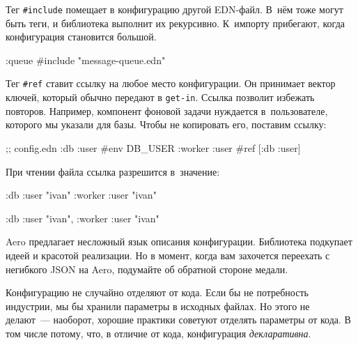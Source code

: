 \fi

Тег \verb|#include| помещает в конфигурацию другой EDN-файл. В~нём тоже могут
быть теги, и библиотека выполнит их рекурсивно. К~импорту прибегают, когда
конфигурация становится большой.

\begin{english}
  \begin{clojure}
{:queue #include "message-queue.edn"}
  \end{clojure}
\end{english}

Тег \verb|#ref| ставит ссылку на любое место конфигурации. Он принимает вектор
ключей, который обычно передают в \verb|get-in|. Ссылка позволит избежать
повторов.  Например, компонент фоновой задачи нуждается в~пользователе, которого
мы указали для базы. Чтобы не копировать его, поставим ссылку:

\begin{english}
  \begin{clojure}
;; config.edn
{:db {:user #env DB_USER}
 :worker {:user #ref [:db :user]}}
  \end{clojure}
\end{english}

\noindent
При чтении файла ссылка разрешится в~значение:

\ifx\DEVICETYPE\MOBILE

\begin{english}
  \begin{clojure}
{:db {:user "ivan"}
 :worker {:user "ivan"}}
  \end{clojure}
\end{english}

\else

\begin{english}
  \begin{clojure}
{:db {:user "ivan"}, :worker {:user "ivan"}}
  \end{clojure}
\end{english}

\fi

Aero предлагает несложный язык описания конфигурации. Библиотека подкупает идеей
и красотой реализации. Но в момент, когда вам захочется переехать с негибкого
JSON на Aero, подумайте об обратной стороне медали.


Конфигурацию не случайно отделяют от кода. Если бы не потребность индустрии, мы
бы хранили параметры в исходных файлах. Но этого не делают~--- наоборот, хорошие
практики советуют отделять параметры от кода. В том числе потому, что, в
отличие от кода, конфигурация \emph{декларативна}.

